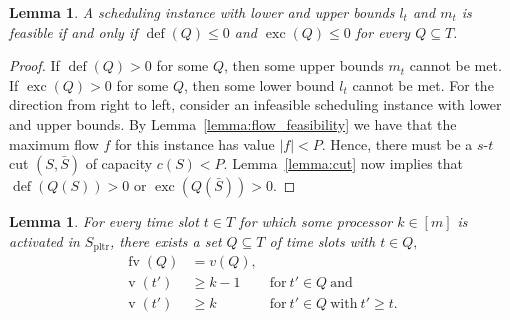 \documentclass[a4paper]{article}
\DeclareMathOperator{\PLTR}{pltr}
\DeclareMathOperator{\fv}{fv}
\DeclareMathOperator{\vol}{v}
\DeclareMathOperator{\opdef}{def}
\DeclareMathOperator{\exc}{exc}
\newtheorem{lemma}[theorem]{Lemma}
\begin{document}
\begin{lemma}\label{lemma:feasibility}
  A scheduling instance with lower and upper bounds $l_t$ and $m_t$ is feasible if and only if $\opdef(Q) \leq 0$ and $\exc(Q) \leq 0$ for every $Q \subseteq T$.
\end{lemma}
\begin{proof}
  If $\opdef(Q) > 0$ for some $Q$, then some upper bounds $m_t$ cannot be met.
  If $\exc(Q) > 0$ for some $Q$, then some lower bound $l_t$ cannot be met.
  For the direction from right to left, consider an infeasible scheduling instance with lower and upper bounds.
  By Lemma~\ref{lemma:flow_feasibility} we have that the maximum flow $f$ for this instance has value $|f| < P$.
  Hence, there must be a $s$-$t$ cut $(S, \bar S)$ of capacity $c(S) < P$.
  Lemma~\ref{lemma:cut} now implies that $\opdef(Q(S)) > 0$ or $\exc(Q(\bar S)) > 0$.
\end{proof}
\begin{lemma}\label{lemma:critical}
  For every time slot $t \in T$ for which some processor $k \in [m]$ is activated in $S_{\PLTR}$, there exists a set $Q \subseteq T$ of time slots with $t \in Q, $
  \begin{align}
    \fv(Q) &= v(Q) \text{,}\\
    \vol(t') &\geq k-1 &~\text{for}~t' \in Q~\text{and}\\
    \vol(t') &\geq k &~\text{for}~t' \in Q~\text{with}~t' \geq t \text{.}
  \end{align}
\end{lemma}
\end{document}
